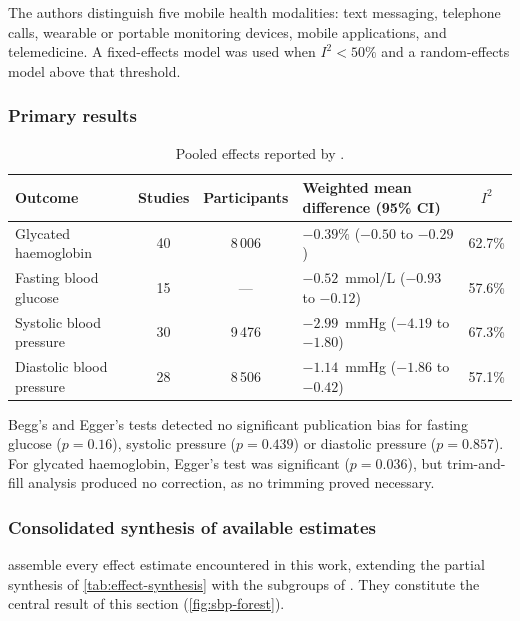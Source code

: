 \documentclass[12pt,a4paper,oneside]{report}
\begin{document}
The authors distinguish five mobile health modalities: text messaging, telephone calls, wearable or portable monitoring devices, mobile applications, and telemedicine. A fixed-effects model was used when $I^2 < 50\%$ and a random-effects model above that threshold.

\subsubsection{Primary results}

\begin{table}[htbp]
\centering\small
\caption{Pooled effects reported by \textcite{mao2020}.}\label{tab:mao-results}
\begin{tabularx}{\textwidth}{@{}X c c >{\raggedright\arraybackslash}p{4.0cm} c@{}}
\toprule
\textbf{Outcome} & \textbf{Studies} & \textbf{Participants} & \textbf{Weighted mean difference (95\% CI)} & \textbf{$I^2$} \\
\midrule
Glycated haemoglobin & 40 & 8\,006 & $-0.39\%$ ($-0.50$ to $-0.29$) & 62.7\% \\
Fasting blood glucose & 15 & --- & $-0.52$~mmol/L ($-0.93$ to $-0.12$) & 57.6\% \\
Systolic blood pressure & 30 & 9\,476 & $-2.99$~mmHg ($-4.19$ to $-1.80$) & 67.3\% \\
Diastolic blood pressure & 28 & 8\,506 & $-1.14$~mmHg ($-1.86$ to $-0.42$) & 57.1\% \\
\bottomrule
\end{tabularx}
\end{table}

Begg's and Egger's tests detected no significant publication bias for fasting glucose ($p = 0.16$), systolic pressure ($p = 0.439$) or diastolic pressure ($p = 0.857$). For glycated haemoglobin, Egger's test was significant ($p = 0.036$), but trim-and-fill analysis produced no correction, as no trimming proved necessary.

\subsubsection{Consolidated synthesis of available estimates}\label{sec:consolidated}

 assemble every effect estimate encountered in this work, extending the partial synthesis of \cref{tab:effect-synthesis} with the subgroups of \textcite{mao2020}. They constitute the central result of this section (\cref{fig:sbp-forest}).
\end{document}
